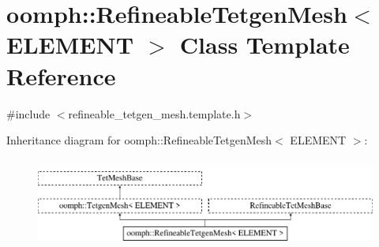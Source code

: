 \hypertarget{classoomph_1_1RefineableTetgenMesh}{}\section{oomph\+:\+:Refineable\+Tetgen\+Mesh$<$ E\+L\+E\+M\+E\+NT $>$ Class Template Reference}
\label{classoomph_1_1RefineableTetgenMesh}


{\ttfamily \#include $<$refineable\+\_\+tetgen\+\_\+mesh.\+template.\+h$>$}

Inheritance diagram for oomph\+:\+:Refineable\+Tetgen\+Mesh$<$ E\+L\+E\+M\+E\+NT $>$\+:\begin{figure}[H]
\begin{center}
\leavevmode
\includegraphics[height=3.000000cm]{classoomph_1_1RefineableTetgenMesh}
\end{center}
\end{figure}
